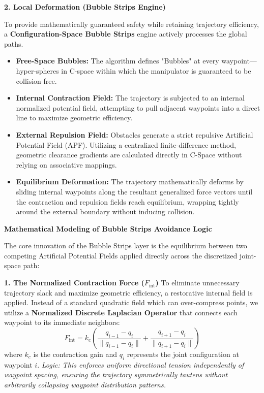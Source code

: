 \documentclass[11pt, a4paper]{article}
\begin{document}
\vspace{0.4cm}
{\large\textbf{2. Local Deformation (Bubble Strips Engine)}}

To provide mathematically guaranteed safety while retaining trajectory efficiency, a \textbf{Configuration-Space Bubble Strips} engine actively processes the global paths.

\begin{itemize}
    \item \textbf{Free-Space Bubbles:} The algorithm defines "Bubbles" at every waypoint—hyper-spheres in C-space within which the manipulator is guaranteed to be collision-free. 
    \item \textbf{Internal Contraction Field:} The trajectory is subjected to an internal normalized potential field, attempting to pull adjacent waypoints into a direct line to maximize geometric efficiency.
    \item \textbf{External Repulsion Field:} Obstacles generate a strict repulsive Artificial Potential Field (APF). Utilizing a centralized finite-difference method, geometric clearance gradients are calculated directly in C-Space without relying on associative mappings.
    \item \textbf{Equilibrium Deformation:} The trajectory mathematically deforms by sliding internal waypoints along the resultant generalized force vectors until the contraction and repulsion fields reach equilibrium, wrapping tightly around the external boundary without inducing collision.
\end{itemize}

\vspace{0.6cm}
{\Large\textbf{Mathematical Modeling of Bubble Strips Avoidance Logic}}

The core innovation of the Bubble Strips layer is the equilibrium between two competing Artificial Potential Fields applied directly across the discretized joint-space path:

\vspace{0.2cm}

\textbf{1. The Normalized Contraction Force ($F_{\text{int}}$)}
To eliminate unnecessary trajectory slack and maximize geometric efficiency, a restorative internal field is applied. Instead of a standard quadratic field which can over-compress points, we utilize a \textbf{Normalized Discrete Laplacian Operator} that connects each waypoint to its immediate neighbors:
\begin{equation}
    F_{\text{int}} = k_{c} \left( \frac{q_{i-1} - q_i}{\|q_{i-1} - q_i\|} + \frac{q_{i+1} - q_i}{\|q_{i+1} - q_i\|} \right)
\end{equation}
where $k_{c}$ is the contraction gain and $q_{i}$ represents the joint configuration at waypoint $i$. 
\textit{Logic: This enforces uniform directional tension independently of waypoint spacing, ensuring the trajectory symmetrically tautens without arbitrarily collapsing waypoint distribution patterns.}
\end{document}
